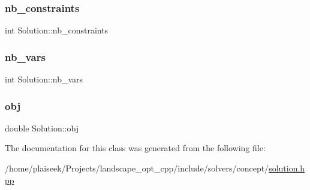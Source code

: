 \subsubsection{\texorpdfstring{nb\+\_\+constraints}{nb\_constraints}}
{\footnotesize\ttfamily int Solution\+::nb\+\_\+constraints}

\mbox{\label{class_solution_ada3534c6614de6c21ed6406ead921ca2}} 
\subsubsection{\texorpdfstring{nb\+\_\+vars}{nb\_vars}}
{\footnotesize\ttfamily int Solution\+::nb\+\_\+vars}

\mbox{\label{class_solution_a261a9de1b33f8ec6219a88073aea29e9}} 
\subsubsection{\texorpdfstring{obj}{obj}}
{\footnotesize\ttfamily double Solution\+::obj}



The documentation for this class was generated from the following file\+:\begin{DoxyCompactItemize}
\item 
/home/plaiseek/\+Projects/landscape\+\_\+opt\+\_\+cpp/include/solvers/concept/\hyperlink{solution_8hpp}{solution.\+hpp}\end{DoxyCompactItemize}
